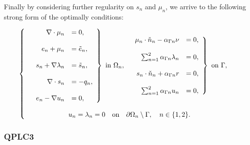 Finally by considering further regularity on $s_n$ and $\mu_n$, we arrive to the following strong form of the optimally conditions:

\begin{equation}
\left\lbrace
\begin{array}{c}
\begin{array}{c c}
\left.
\begin{array}{rl}
	\nabla \cdot \mu_n     &= 0,\\
    \\
    e_n + \mu_n            &= \tilde{e}_n,\\
    \\
    s_n + \nabla \lambda_n &= \tilde{s}_n,\\
	  \\
	\nabla \cdot s_n       &=-q_n,\\
    \\
    e_n - \nabla u_n       &= 0,
\end{array}
\right\rbrace \textrm{ in } \Omega_n,
&
\left.
\begin{array}{rl}
	  \mu_n\cdot\check{n}_n - \alpha_{\Gamma n} \nu        &= 0,\\
    \\
    \sum_{n = 1}^2 \alpha_{\Gamma n} \lambda_n &= 0,\\ 
    \\
    s_n\cdot\check{n}_n + \alpha_{\Gamma n} r            &= 0,\\
    \\
    \sum_{n = 1}^2 \alpha_{\Gamma n} u_n       &= 0, 
\end{array}
\right\rbrace \textrm{ on } \Gamma,
\end{array}
\\
\\
u_n = \lambda_n = 0 \quad \textrm{on} \quad \partial \Omega_n \setminus \Gamma, \quad n \in \{ 1,2\}.
\end{array}
\right. 
\end{equation}

\subsubsection{QPLC3}

